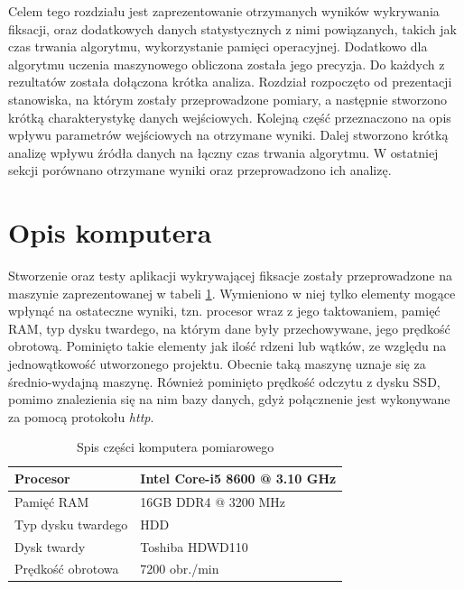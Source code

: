 Celem tego rozdziału jest zaprezentowanie otrzymanych wyników wykrywania fiksacji, oraz dodatkowych danych statystycznych z nimi powiązanych, takich jak czas trwania algorytmu, wykorzystanie pamięci operacyjnej. Dodatkowo dla algorytmu uczenia maszynowego obliczona została jego precyzja. Do każdych z rezultatów została dołączona krótka analiza. Rozdział rozpoczęto od prezentacji stanowiska, na którym zostały przeprowadzone pomiary, a następnie stworzono krótką charakterystykę danych wejściowych. Kolejną część przeznaczono na opis wpływu parametrów wejściowych na otrzymane wyniki. Dalej stworzono krótką analizę wpływu źródła danych na łączny czas trwania algorytmu. W ostatniej sekcji porównano otrzymane wyniki oraz przeprowadzono ich analizę.\par
\section{Opis komputera}
Stworzenie oraz testy aplikacji wykrywającej fiksacje zostały przeprowadzone na maszynie zaprezentowanej w tabeli \ref{tab:machine}. Wymieniono w niej tylko elementy mogące wpłynąć na ostateczne wyniki, tzn. procesor wraz z jego taktowaniem, pamięć RAM, typ dysku twardego, na którym dane były przechowywane, jego prędkość obrotową. Pominięto takie elementy jak ilość rdzeni lub wątków, ze względu na jednowątkowość utworzonego projektu. Obecnie taką maszynę uznaje się za średnio-wydajną maszynę. Również pominięto prędkość odczytu z dysku SSD, pomimo znalezienia się na nim bazy danych, gdyż połącznenie jest wykonywane za pomocą protokołu \emph{http}.\par
\begin{table}[H]
    \centering
    \begin{tabular}{|l|l|}
        \hline
        Procesor       & Intel Core-i5 8600 @ 3.10 GHz          \\ \hline
        Pamięć RAM     & 16GB DDR4 @ 3200 MHz \\ \hline
        Typ dysku twardego           & HDD              \\ \hline
        Dysk twardy         & Toshiba HDWD110              \\ \hline
        Prędkość obrotowa         & 7200 obr./min              \\ \hline
    \end{tabular}
    \caption{Spis części komputera pomiarowego}
    \label{tab:machine}
\end{table}

